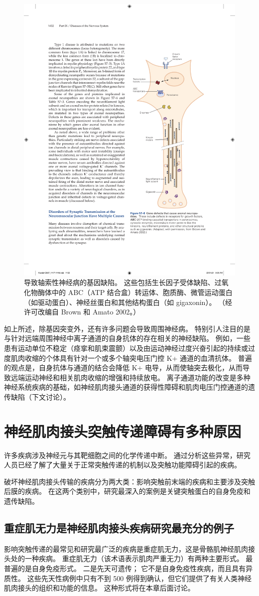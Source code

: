 \begin{figure}[htbp]
	\centering
	\includegraphics[width=0.5\linewidth]{chap57/fig_57_6}
	\caption{导致轴索性神经病的基因缺陷。 这些包括生长因子受体缺陷、过氧化物酶体中的 ABC（ATP 结合盒）转运体、胞质酶、微管运动蛋白（如驱动蛋白）、神经丝蛋白和其他结构蛋白（如 gigaxonin）。 （经许可改编自 Brown 和 Amato 2002。）}
	\label{fig:57_6}
\end{figure}

如上所述，除基因突变外，还有许多问题会导致周围神经病。 特别引人注目的是与针对远端周围神经中离子通道的自身抗体的存在相关的神经缺陷。 例如，一些患有运动单位不稳定（痉挛和肌束震颤）以及由运动神经过度兴奋引起的持续或过度肌肉收缩的个体具有针对一个或多个轴突电压门控 K+ 通道的血清抗体。 普遍的观点是，自身抗体与通道的结合会降低 K+ 电导，从而使轴突去极化，从而导致远端运动神经和相关肌肉收缩的增强和持续放电。 离子通道功能的改变是多种神经系统疾病的基础，如神经肌肉接头通道的获得性障碍和肌肉电压门控通道的遗传缺陷（下文讨论）。


\section{神经肌肉接头突触传递障碍有多种原因}
许多疾病涉及神经元与其靶细胞之间的化学传递中断。 通过分析这些异常，研究人员已经了解了大量关于正常突触传递的机制以及突触功能障碍引起的疾病。

破坏神经肌肉接头传输的疾病分为两大类：影响突触前末端的疾病和主要涉及突触后膜的疾病。 在这两个类别中，研究最深入的案例是关键突触蛋白的自身免疫和遗传缺陷。

\subsection{重症肌无力是神经肌肉接头疾病研究最充分的例子}
影响突触传递的最常见和研究最广泛的疾病是重症肌无力，这是骨骼肌神经肌肉接头处的一种疾病。 重症肌无力（该术语表示肌肉严重无力）有两种主要形式。 最普遍的是自身免疫形式。 二是先天可遗传； 它不是自身免疫性疾病，而且具有异质性。 这些先天性病例中只有不到 500 例得到确认，但它们提供了有关人类神经肌肉接头的组织和功能的信息。 这种形式将在本章后面讨论。

